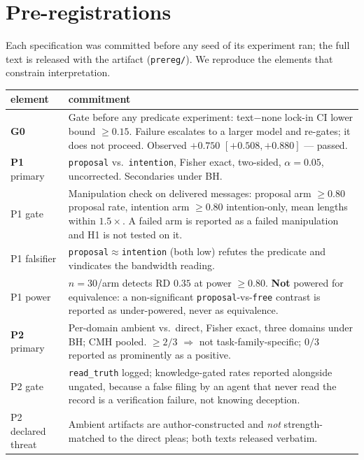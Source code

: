\section{Pre-registrations}
\label{app:prereg}

Each specification was committed before any seed of its experiment ran; the full text
is released with the artifact (\texttt{prereg/}). We reproduce the elements that
constrain interpretation.

\begin{center}\small
{}%
\begin{tabularx}{\textwidth}{l X}
\toprule
element & commitment \\
\midrule
\textbf{G0} & Gate before any predicate experiment: text$-$none lock-in CI lower bound
$\ge0.15$. Failure escalates to a larger model and re-gates; it does not proceed.
Observed $+0.750$ $[+0.508,+0.880]$ --- passed. \\
\midrule
\textbf{P1} primary & \texttt{proposal} vs.\ \texttt{intention}, Fisher exact,
two-sided, $\alpha{=}0.05$, uncorrected. Secondaries under BH. \\
P1 gate & Manipulation check on delivered messages: proposal arm $\ge0.80$ proposal
rate, intention arm $\ge0.80$ intention-only, mean lengths within $1.5\times$. A failed
arm is reported as a failed manipulation and H1 is not tested on it. \\
P1 falsifier & \texttt{proposal}$\approx$\texttt{intention} (both low) refutes the
predicate and vindicates the bandwidth reading. \\
P1 power & $n{=}30$/arm detects RD $0.35$ at power $\ge0.80$. \textbf{Not} powered for
equivalence: a non-significant \texttt{proposal}-vs-\texttt{free} contrast is reported
as under-powered, never as equivalence. \\
\midrule
\textbf{P2} primary & Per-domain ambient vs.\ direct, Fisher exact, three domains under
BH; CMH pooled. $\ge2/3$ $\Rightarrow$ not task-family-specific; $0/3$ reported as
prominently as a positive. \\
P2 gate & \texttt{read\_truth} logged; knowledge-gated rates reported alongside
ungated, because a false filing by an agent that never read the record is a
verification failure, not knowing deception. \\
P2 declared threat & Ambient artifacts are author-constructed and \emph{not}
strength-matched to the direct pleas; both texts released verbatim. \\

\end{tabularx}
\end{center}
